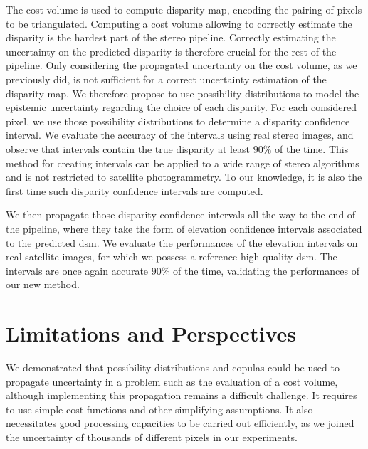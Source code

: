 The cost volume is used to compute disparity map, encoding the pairing of pixels to be triangulated. Computing a cost volume allowing to correctly estimate the disparity is the hardest part of the stereo pipeline. Correctly estimating the uncertainty on the predicted disparity is therefore crucial for the rest of the pipeline. Only considering the propagated uncertainty on the cost volume, as we previously did, is not sufficient for a correct uncertainty estimation of the disparity map. We therefore propose to use possibility distributions to model the epistemic uncertainty regarding the choice of each disparity. For each considered pixel, we use those possibility distributions to determine a disparity confidence interval. We evaluate the accuracy of the intervals using real stereo images, and observe that intervals contain the true disparity at least $90\%$ of the time. This method for creating intervals can be applied to a wide range of stereo algorithms and is not restricted to satellite photogrammetry. To our knowledge, it is also the first time such disparity confidence intervals are computed. 

We then propagate those disparity confidence intervals all the way to the end of the pipeline, where they take the form of elevation confidence intervals associated to the predicted \acrshort{dsm}. We evaluate the performances of the elevation intervals on real satellite images, for which we possess a reference high quality \acrshort{dsm}. The intervals are once again accurate $90\%$ of the time, validating the performances of our new method.


\section*{Limitations and Perspectives}
We demonstrated that possibility distributions and copulas could be used to propagate uncertainty in a problem such as the evaluation of a cost volume, although implementing this propagation remains a difficult challenge. It requires to use simple cost functions and other simplifying assumptions. It also necessitates good processing capacities to be carried out efficiently, as we joined the uncertainty of thousands of different pixels in our experiments.

